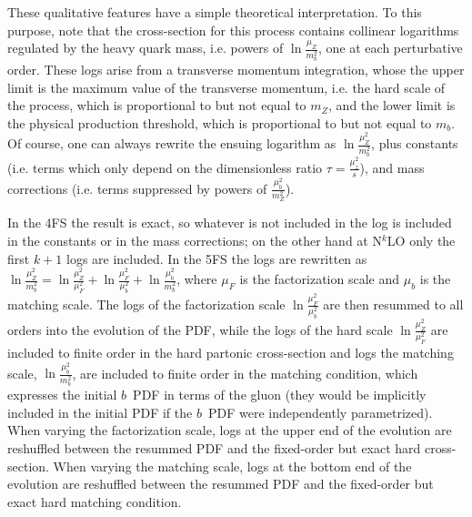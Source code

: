 \documentclass[12pt]{article}
\begin{document}
These qualitative features have a simple theoretical
interpretation. To this purpose, note that the cross-section for
this process contains collinear logarithms regulated by the heavy
quark mass, i.e. powers of $\ln\frac{\mu_Z}{m_b^2}$, one at each
perturbative order. These logs  
arise from a transverse
momentum integration, whose the upper limit is the maximum value of the
transverse momentum, i.e. the hard scale of the process, 
which is proportional to but not equal to $m_Z$, and the lower limit
is the physical production threshold, which is proportional to but not
equal to $m_b$. Of course, one can always rewrite the ensuing
logarithm as  $\ln\frac{\mu_Z^2}{m_b^2}$, plus constants (i.e. terms
which only depend on the dimensionless ratio $\tau=\frac{\mu_z^2}{s}$),
and mass corrections (i.e. terms suppressed by powers of
$\frac{\mu^2_b}{m_Z^2}$). 

In the 4FS the result is exact, so whatever is not included in the log is included in
the constants or in the mass corrections; on the other hand at
N$^{k}$LO only the first $k+1$ logs are included. In the 5FS the logs are
rewritten as
$\ln\frac{\mu_Z^2}{m_b^2}=\ln\frac{\mu_Z^2}{\mu_F^2}+\ln\frac{\mu_F^2}{\mu_b^2}+\ln\frac{\mu_b^2}{m_b^2}
$, where $\mu_F$ is the factorization  scale and 
$\mu_b$ is the matching scale. The logs of the factorization scale 
$\ln\frac{\mu_F^2}{\mu_b^2}$ are then resummed to all orders into
the evolution of the PDF, while
the logs of the hard scale $\ln\frac{\mu_Z^2}{\mu_F^2}$ are included to
finite order in the hard partonic cross-section and
logs the matching scale, $\ln\frac{\mu_b^2}{m_b^2}$, are 
included to finite order in the matching condition, which
expresses the initial $b$~PDF in terms of the gluon (they would be 
implicitly included in the initial PDF
if the $b$~PDF were independently parametrized).
When varying the factorization scale, logs at the upper end
of the evolution are reshuffled between the resummed PDF and the
fixed-order but exact hard cross-section. When varying the matching
scale, logs at the bottom end 
of the evolution are reshuffled between the resummed PDF and the
fixed-order but exact hard matching condition.
\end{document}

